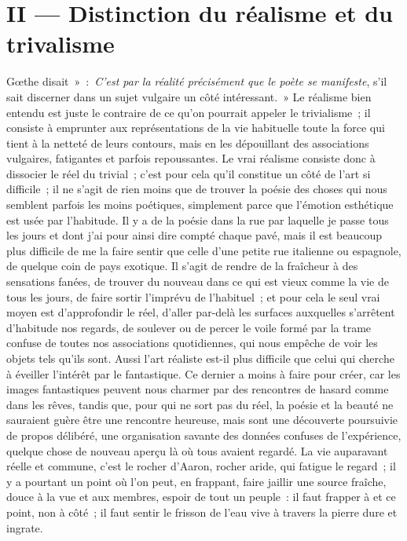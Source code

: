 \documentclass[french,twoside]{book} %
\begin{document}
\section[{II — Distinction du réalisme et du trivalisme}]{II — Distinction du réalisme et du trivalisme}
\noindent Gœthe disait » : \emph{C’est par la réalité précisément que le poète se manifeste}, s’il sait discerner dans un sujet vulgaire un côté intéressant. » Le réalisme bien entendu est juste le contraire de ce qu’on pourrait appeler le trivialisme ; il consiste à emprunter aux représentations de la vie habituelle toute la force qui tient à la netteté de leurs contours, mais en les dépouillant des associations vulgaires, fatigantes et parfois repoussantes. Le vrai réalisme consiste donc à dissocier le réel du trivial ; c’est pour cela qu’il constitue un côté de l’art si difficile ; il ne s’agit de rien moins que de trouver la poésie des choses qui nous semblent parfois les moins poétiques, simplement parce que l’émotion esthétique est usée par l’habitude. Il y a de la poésie dans la rue par laquelle je passe tous les jours et dont j’ai pour ainsi dire compté chaque pavé, mais il est beaucoup plus difficile de me la faire sentir que celle d’une petite rue italienne ou espagnole, de quelque coin de pays exotique. Il s’agit de rendre de la fraîcheur à des sensations fanées, de trouver du nouveau dans ce qui est vieux comme la vie de tous les jours, de faire sortir l’imprévu de l’habituel ; et pour cela le seul vrai moyen est d’approfondir le réel, d’aller par-delà les surfaces auxquelles s’arrêtent d’habitude nos regards, de soulever ou de percer le voile formé par la trame confuse de toutes nos associations quotidiennes, qui nous empêche de voir les objets tels qu’ils sont. Aussi l’art réaliste est-il plus difficile que celui qui cherche à éveiller l’intérêt par le fantastique. Ce dernier a moins à faire pour créer, car les images fantastiques peuvent nous charmer par des rencontres de hasard comme dans les rêves, tandis que, pour qui ne sort pas du réel, la poésie et la beauté ne sauraient guère être une rencontre heureuse, mais sont une découverte poursuivie de propos délibéré, une organisation savante des données confuses de l’expérience, quelque chose de nouveau aperçu là où tous avaient regardé. La vie auparavant réelle et commune, c’est le rocher d’Aaron, rocher aride, qui fatigue le regard ; il y a pourtant un point où l’on peut, en frappant, faire jaillir une source fraîche, douce à la vue et aux membres, espoir de tout un peuple : il faut frapper à et ce point, non à côté ; il faut sentir le frisson de l’eau vive à travers la pierre dure et ingrate.\par
\end{document}
